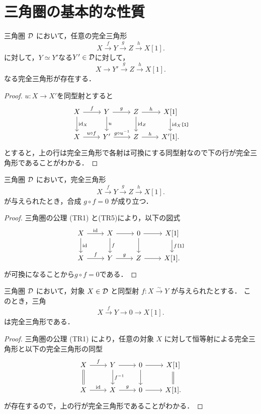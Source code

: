 \section{三角圏の基本的な性質}
\begin{prop}\cite[p.245]{KS06}
三角圏 ${\mathcal D}$ において，任意の完全三角形
\[
X \xrightarrow{f} Y \xrightarrow{g} Z \xrightarrow{h} X[1].
\]
に対して，$Y\simeq Y'$なる$Y'\in{\mathcal D}$に対して，
\[
X \xrightarrow{} Y' \xrightarrow{g} Z \xrightarrow{h} X[1].
\]
なる完全三角形が存在する．
\end{prop}
\begin{proof}
	$u\colon X\to X'$を同型射とすると
		\[
\begin{tikzcd}
	X\ar[r,"f"]\ar[d,"\id_X"]&Y \ar[r,"g"]\ar[d,"u"]& Z\ar[r,"h"]\ar[d,"\id_Z"]& X[1]\ar[d,"\id_X\texttt{[1]}"]\\
	X\ar[r,"u\circ f"]&Y' \ar[r,"g\circ u^{-1}"]& Z\ar[r,"h"]& X'[1].
\end{tikzcd}
	\]
とすると，上の行は完全三角形で各射は可換にする同型射なので下の行が完全三角形であることがわかる．
\end{proof}
\begin{prop}\cite[p.245]{KS06}\label{gf=0}
三角圏 ${\mathcal D}$ において，完全三角形
\[
X \xrightarrow{f} Y \xrightarrow{g} Z \xrightarrow{h} X[1].
\]
が与えられたとき，合成 $g \circ f = 0$ が成り立つ．
\end{prop}

\begin{proof}
三角圏の公理 (TR1) と(TR5)により，以下の図式
		\[
\begin{tikzcd}
	X\ar[r,"\id"]\ar[d,"\id"]&X \ar[r]\ar[d,"f"]& 0\ar[r]\ar[d]& X[1]\ar[d,"f\texttt{[1]}"]\\
	X\ar[r,"f"]&Y \ar[r,"g"]& Z\ar[r]& X[1].
\end{tikzcd}
	\]
	が可換になることから$g\circ f = 0$である．
\end{proof}

\begin{prop}\cite[p.245]{KS06}
三角圏 ${\mathcal D}$ において，対象 $X \in {\mathcal D}$ と同型射 $f \colon X \xrightarrow{\sim} Y$ が与えられたとする．
このとき，三角
\[
X \xrightarrow{f} Y \to 0 \to X[1].
\]
は完全三角形である．
\end{prop}

\begin{proof}
三角圏の公理 \textnormal{(TR1)} により，任意の対象 $X$ に対して恒等射による完全三角形と以下の完全三角形の同型
		\[
\begin{tikzcd}
	X\ar[r,"f"]\ar[d,equal]&Y \ar[r]\ar[d,"f\inv"]& 0\ar[r]\ar[d]& X[1]\ar[d,equal]\\
	X\ar[r,"\id"]&X \ar[r,"g"]& 0\ar[r]& X[1].
\end{tikzcd}
	\]
	が存在するので，上の行が完全三角形であることがわかる．
\end{proof}

